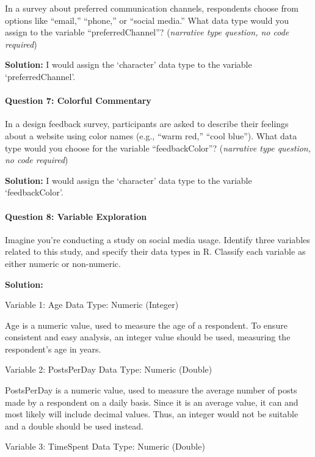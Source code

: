 \documentclass[
]{article}
\begin{document}
In a survey about preferred communication channels, respondents choose
from options like ``email,'' ``phone,'' or ``social media.'' What data
type would you assign to the variable ``preferredChannel''?
(\emph{narrative type question, no code required})

\textbf{Solution:} I would assign the `character' data type to the
variable `preferredChannel'.

\hypertarget{question-7-colorful-commentary}{%
\paragraph{Question 7: Colorful
Commentary}\label{question-7-colorful-commentary}}

In a design feedback survey, participants are asked to describe their
feelings about a website using color names (e.g., ``warm red,'' ``cool
blue''). What data type would you choose for the variable
``feedbackColor''? (\emph{narrative type question, no code required})

\textbf{Solution:} I would assign the `character' data type to the
variable `feedbackColor'.

\hypertarget{question-8-variable-exploration}{%
\paragraph{Question 8: Variable
Exploration}\label{question-8-variable-exploration}}

Imagine you're conducting a study on social media usage. Identify three
variables related to this study, and specify their data types in R.
Classify each variable as either numeric or non-numeric.

\textbf{Solution:}

Variable 1: Age Data Type: Numeric (Integer)

Age is a numeric value, used to measure the age of a respondent. To
ensure consistent and easy analysis, an integer value should be used,
measuring the respondent's age in years.

Variable 2: PostsPerDay Data Type: Numeric (Double)

PostsPerDay is a numeric value, used to measure the average number of
posts made by a respondent on a daily basis. Since it is an average
value, it can and most likely will include decimal values. Thus, an
integer would not be suitable and a double should be used instead.

Variable 3: TimeSpent Data Type: Numeric (Double)
\end{document}
